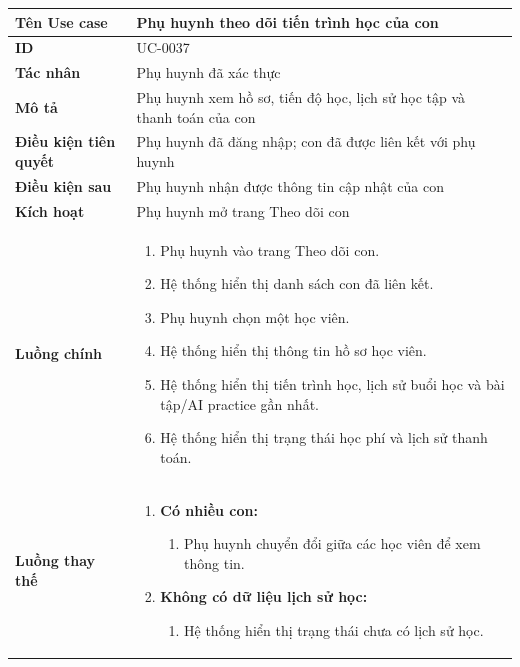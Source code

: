 {
\small
\renewcommand{\arraystretch}{1.15}

\begin{tabularx}{\textwidth}{|>{\raggedright\arraybackslash}p{3.5cm}|>{\raggedright\arraybackslash}X|}
\hline
\textbf{Tên Use case} & Phụ huynh theo dõi tiến trình học của con \\
\hline
\textbf{ID} & UC-0037 \\
\hline
\textbf{Tác nhân} & Phụ huynh đã xác thực \\
\hline
\textbf{Mô tả} & Phụ huynh xem hồ sơ, tiến độ học, lịch sử học tập và thanh toán của con \\
\hline
\textbf{Điều kiện tiên quyết} & Phụ huynh đã đăng nhập; con đã được liên kết với phụ huynh \\
\hline
\textbf{Điều kiện sau} & Phụ huynh nhận được thông tin cập nhật của con \\
\hline
\textbf{Kích hoạt} & Phụ huynh mở trang Theo dõi con \\
\hline
\textbf{Luồng chính} &
\begin{enumerate}
    \item Phụ huynh vào trang Theo dõi con.
    \item Hệ thống hiển thị danh sách con đã liên kết.
    \item Phụ huynh chọn một học viên.
    \item Hệ thống hiển thị thông tin hồ sơ học viên.
    \item Hệ thống hiển thị tiến trình học, lịch sử buổi học và bài tập/AI practice gần nhất.
    \item Hệ thống hiển thị trạng thái học phí và lịch sử thanh toán.
\end{enumerate} \\
\hline
\textbf{Luồng thay thế} &
\begin{enumerate}
    \item \textbf{Có nhiều con:}
    \begin{enumerate}
        \item[3A.] Phụ huynh chuyển đổi giữa các học viên để xem thông tin.
    \end{enumerate}
    \item \textbf{Không có dữ liệu lịch sử học:}
    \begin{enumerate}
        \item[5B.] Hệ thống hiển thị trạng thái chưa có lịch sử học.
    \end{enumerate}
\end{enumerate} \\

\end{tabularx}}
